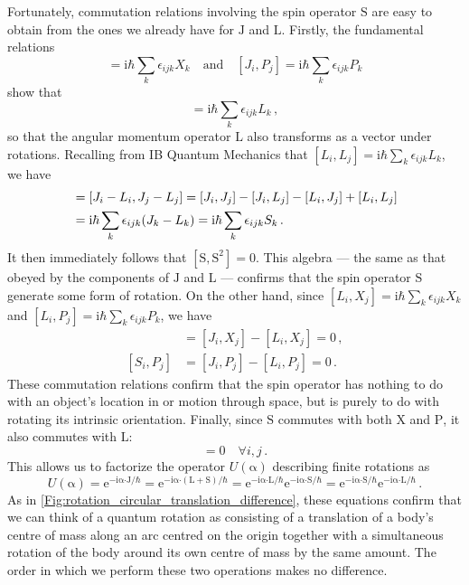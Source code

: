 \documentclass{article}
\theoremstyle{plain}\theoremheaderfont{\normalfont\itshape}\theorembodyfont{\rmfamily}\theoremseparator{.}\newtheorem*{rem}{Remark}\newtheorem*{ex}{Example}\newtheorem*{proof}{Proof}\newtheorem*{altp}{Alternative proof}
\theoremstyle{plain}\theoremheaderfont{\normalfont\bfseries}\theorembodyfont{\rmfamily}\theoremseparator{.}\newtheorem{thm}{Theorem}[section]\newtheorem{lem}[thm]{Lemma}\newtheorem{prop}[thm]{Proposition}\newtheorem*{cor}{Corollary}\newtheorem{defn}[thm]{Definition}\newtheorem{clm}[thm]{Claim}\newtheorem{clminproof}{Claim}
\theoremstyle{break}\theoremheaderfont{\normalfont\itshape}\theorembodyfont{\rmfamily}\theoremseparator{.\medskip}\newtheorem*{proofskip}{Proof}\newtheorem*{exs}{Examples}\newtheorem*{rems}{Remarks}
\theoremstyle{break}\theoremheaderfont{\normalfont\bfseries}\theorembodyfont{\rmfamily}\theoremseparator{.\medskip}\newtheorem{lemskip}[thm]{Lemma}\newtheorem{defnskip}[thm]{Definition}\newtheorem{propskip}[thm]{Proposition}\newtheorem{thmskip}[thm]{Theorem}
\numberwithin{equation}{section}
\newcommand{\ii}{\mathrm{i}}
\newcommand{\ee}{\mathrm{e}}
\newcommand{\vb}[1]{\bm{\mathrm{#1}}}
\newcommand{\vdot}{\bm{\cdot}}
\begin{document}
    Fortunately, commutation relations involving the spin operator \(\vb{S}\) are easy to obtain from the ones we already have for \(\vb{J}\) and \(\vb{L}\). Firstly, the fundamental relations
    \begin{equation}
        [J_i,X_j]=\ii\hbar\sum_k \epsilon_{ijk}X_k\quad\text{and}\quad[J_i,P_j]=\ii\hbar\sum_k\epsilon_{ijk}P_k
    \end{equation}
    show that
    \begin{equation}
        [J_i,L_j]=\ii\hbar\sum_k \epsilon_{ijk}L_k\,,
    \end{equation}
    so that the angular momentum operator \(\vb{L}\) also transforms as a vector under rotations. Recalling from IB Quantum Mechanics that \([L_i,L_j]=\ii\hbar\sum_k\epsilon_{ijk}L_k\), we have
    \begin{align}
        [S_i,S_j]&=[J_i-L_i,J_j-L_j]=[J_i,J_j]-[J_i,L_j]-[L_i,J_j]+[L_i,L_j]\notag\\
        &=\ii\hbar\sum_{k}\epsilon_{ijk}(J_k-L_k)=\ii\hbar\sum_k\epsilon_{ijk}S_k\,.
    \end{align}
    It then immediately follows that \([\vb{S},\vb{S}^2]=0\). This algebra --- the same as that obeyed by the components of \(\vb{J}\) and \(\vb{L}\) --- confirms that the spin operator \(\vb{S}\) generate some form of rotation. On the other hand, since \([L_i,X_j]=\ii\hbar\sum_k\epsilon_{ijk}X_k\) and \([L_i,P_j]=\ii\hbar\sum_k\epsilon_{ijk}P_k\), we have
    \begin{align}
        [S_i,X_j]&=[J_i,X_j]-[L_i,X_j]=0\,,\\
        [S_i,P_j]&=[J_i,P_j]-[L_i,P_j]=0\,.
    \end{align}
    These commutation relations confirm that the spin operator has nothing to do with an object's location in or motion through space, but is purely to do with rotating its intrinsic orientation. Finally, since \(\vb{S}\) commutes with both \(\vb{X}\) and \(\vb{P}\), it also commutes with \(\vb{L}\):
    \begin{equation}
        [S_i,L_j]=0\quad\forall i,j\,.
    \end{equation}
    This allows us to factorize the operator \(U(\vb{\alpha})\) describing finite rotations as
    \begin{equation}
        U(\vb{\alpha})=\ee^{-\ii \vb{\alpha}\vdot\vb{J}/\hbar}=\ee^{-\ii \vb{\alpha}\vdot(\vb{L}+\vb{S})/\hbar}=\ee^{-\ii \vb{\alpha}\vdot\vb{L}/\hbar}\ee^{-\ii \vb{\alpha}\vdot\vb{S}/\hbar}=\ee^{-\ii \vb{\alpha}\vdot\vb{S}/\hbar}\ee^{-\ii \vb{\alpha}\vdot\vb{L}/\hbar}\,.
    \end{equation}
    As in \cref{Fig:rotation_circular_translation_difference}, these equations confirm that we can think of a quantum rotation as consisting of a translation of a body's centre of mass along an arc centred on the origin together with a simultaneous rotation of the body around its own centre of mass by the same amount. The order in which we perform these two operations makes no difference.
\end{document}
